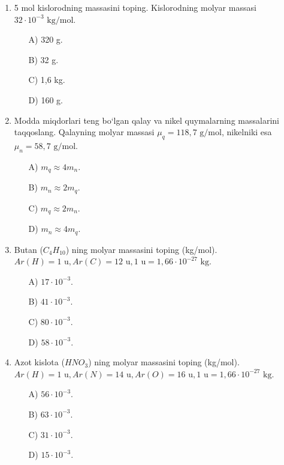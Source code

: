 \begin{enumerate}
\begin{itemize}
    \end{itemize}

    \item 5 mol kislorodning massasini toping. Kislorodning molyar massasi $32 \cdot 10^{-3} \text{ kg/mol}$.
    \begin{itemize}
        \item[A)] 320 g.
        \item[B)] 32 g.
        \item[C)] 1,6 kg.
        \item[D)] 160 g.
        \
    \end{itemize}

    \item Modda miqdorlari teng bo‘lgan qalay va nikel quymalarning massalarini taqqoslang. Qalayning molyar massasi $\mu_q = 118,7 \text{ g/mol}$, nikelniki esa $\mu_n = 58,7 \text{ g/mol}$.
    \begin{itemize}
        \item[A)] $m_q \approx 4m_n$.
        \item[B)] $m_n \approx 2m_q$.
        \item[C)] $m_q \approx 2m_n$.
        \item[D)] $m_n \approx 4m_q$.
        
    \end{itemize}

    \item Butan ($C_4H_{10}$) ning molyar massasini toping (kg/mol). $Ar(H)=1 \text{ u}, Ar(C)=12 \text{ u}, 1 \text{ u} = 1,66 \cdot 10^{-27} \text{ kg}$.
    \begin{itemize}
        \item[A)] $17 \cdot 10^{-3}$.
        \item[B)] $41 \cdot 10^{-3}$.
        \item[C)] $80 \cdot 10^{-3}$.
        \item[D)] $58 \cdot 10^{-3}$.
        
    \end{itemize}

    \item Azot kislota ($HNO_3$) ning molyar massasini toping (kg/mol). $Ar(H)=1 \text{ u}, Ar(N)=14 \text{ u}, Ar(O)=16 \text{ u}, 1 \text{ u} = 1,66 \cdot 10^{-27} \text{ kg}$.
    \begin{itemize}
        \item[A)] $56 \cdot 10^{-3}$.
        \item[B)] $63 \cdot 10^{-3}$.
        \item[C)] $31 \cdot 10^{-3}$.
        \item[D)] $15 \cdot 10^{-3}$.
        

\end{itemize}
\end{enumerate}

